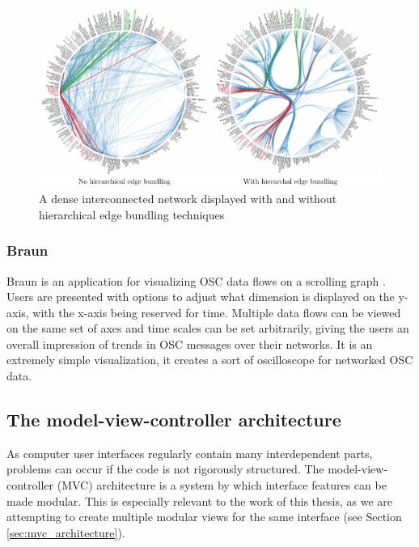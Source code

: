 \begin{figure}[ht]
\centering
	\includegraphics[width=1\textwidth]{figures/heb}
\caption{A dense interconnected network displayed with and without hierarchical edge bundling techniques}
\label{fig:heb}
\end{figure}

	\subsubsection{Braun}

Braun is an application for visualizing OSC data flows on a scrolling graph \cite{braun}. Users are presented with options to adjust what dimension is displayed on the y-axis, with the x-axis being reserved for time. Multiple data flows can be viewed on the same set of axes and time scales can be set arbitrarily, giving the users an overall impression of trends in OSC messages over their networks. It is an extremely simple visualization, it creates a sort of oscilloscope for networked OSC data.

\subsection{The model-view-controller architecture}
\label{sec:mvc_background}

As computer user interfaces regularly contain many interdependent parts, problems can occur if the code is not rigorously structured. The model-view-controller (MVC) architecture \cite{MVC_krasnerpope} is a system by which interface features can be made modular. This is especially relevant to the work of this thesis, as we are attempting to create multiple modular views for the same interface (see Section \ref{sec:mvc_architecture}).

